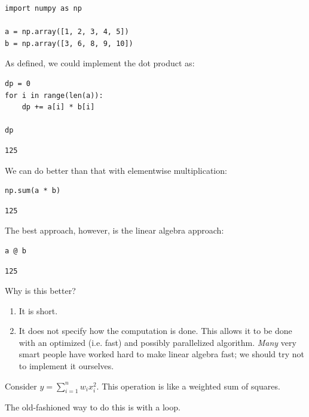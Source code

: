 \documentclass[11pt]{article}
\begin{document}
\begin{verbatim}
import numpy as np

a = np.array([1, 2, 3, 4, 5])
b = np.array([3, 6, 8, 9, 10])
\end{verbatim}

As defined, we could implement the dot product as:

\begin{verbatim}
dp = 0
for i in range(len(a)):
    dp += a[i] * b[i]

dp
\end{verbatim}

\begin{verbatim}
125
\end{verbatim}

We can do better than that with elementwise multiplication:

\begin{verbatim}
np.sum(a * b)
\end{verbatim}

\begin{verbatim}
125
\end{verbatim}

The best approach, however, is the linear algebra approach:

\begin{verbatim}
a @ b
\end{verbatim}

\begin{verbatim}
125
\end{verbatim}

Why is this better?

\begin{enumerate}
\item It is short.
\item It does not specify how the computation is done. This allows it to be done with an optimized (i.e. fast) and possibly parallelized algorithm. \emph{Many} very smart people have worked hard to make linear algebra fast; we should try not to implement it ourselves.
\end{enumerate}


Consider \(y = \sum\limits_{i=1}^n w_i x_i^2\). This operation is like a weighted sum of squares.

The old-fashioned way to do this is with a loop.
\end{document}
